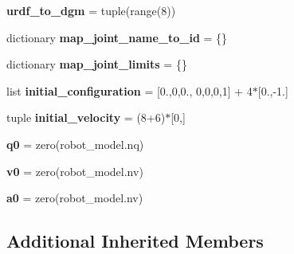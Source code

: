 \begin{DoxyCompactItemize}
\mbox{\label{classrobot__properties__solo_1_1config_1_1SoloConfig_a877fc14fdc03a7bf5b3991f0d11a7392}} 
{\bfseries urdf\+\_\+to\+\_\+dgm} = tuple(range(8))
\item 
\mbox{\label{classrobot__properties__solo_1_1config_1_1SoloConfig_aac97a02a11701c95c2c8719e16a92cbf}} 
dictionary {\bfseries map\+\_\+joint\+\_\+name\+\_\+to\+\_\+id} = \{\}
\item 
\mbox{\label{classrobot__properties__solo_1_1config_1_1SoloConfig_ad3ac7879d8f6d5b6c1c02ea13e45aef8}} 
dictionary {\bfseries map\+\_\+joint\+\_\+limits} = \{\}
\item 
\mbox{\label{classrobot__properties__solo_1_1config_1_1SoloConfig_abdba63d2ef4991c576f26b0a46edfcf7}} 
list {\bfseries initial\+\_\+configuration} = \mbox{[}0.,0,0., 0,0,0,1\mbox{]} + 4$\ast$\mbox{[}0.,-\/1.\mbox{]}
\item 
\mbox{\label{classrobot__properties__solo_1_1config_1_1SoloConfig_a192588a74211fd2b922e1630671e49cc}} 
tuple {\bfseries initial\+\_\+velocity} = (8+6)$\ast$\mbox{[}0,\mbox{]}
\item 
\mbox{\label{classrobot__properties__solo_1_1config_1_1SoloConfig_ad8d81b53294542fc4523d65263e12cc1}} 
{\bfseries q0} = zero(robot\+\_\+model.\+nq)
\item 
\mbox{\label{classrobot__properties__solo_1_1config_1_1SoloConfig_a811dca2e27956d61e4a45b3d62bd7af3}} 
{\bfseries v0} = zero(robot\+\_\+model.\+nv)
\item 
\mbox{\label{classrobot__properties__solo_1_1config_1_1SoloConfig_af3ec693097bbe39397e347532f4aea8b}} 
{\bfseries a0} = zero(robot\+\_\+model.\+nv)
\end{DoxyCompactItemize}
\subsection*{Additional Inherited Members}


